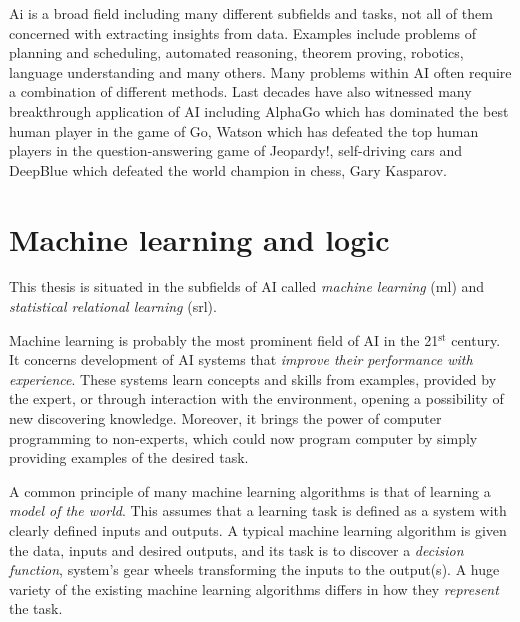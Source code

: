 Ai is a broad field including many different subfields and tasks, not all of them concerned with extracting insights from data.
Examples include problems of planning and scheduling, automated reasoning, theorem proving, robotics, language understanding and many others.
Many problems within AI often require a combination of different methods.
Last decades have also witnessed many breakthrough application of AI including AlphaGo \cite{SilverHuangEtAl16nature,silver2017mastering} which has dominated the best human player in the game of Go, Watson \cite{journals/aim/FerrucciBCFGKLMNPSW10} which has defeated the top human players in the question-answering game of Jeopardy!, self-driving cars and DeepBlue \cite{Hsu:2002:BDB:601291}  which defeated the world champion in chess, Gary Kasparov.





\section{Machine learning and logic}

This thesis is situated in the subfields of AI called \textit{machine learning} (\gls{ml}) and \textit{statistical relational learning} (\gls{srl}).


Machine learning is probably the most prominent field of AI in the 21$^{\text{st}}$ century.
It concerns development of AI systems that \textit{improve their performance with experience}.
These systems learn concepts and skills from examples, provided by the expert, or through interaction with the environment, opening a possibility of new discovering knowledge.
Moreover, it brings the power of computer programming to non-experts, which could now program computer by simply providing examples of the desired task.



A common principle of many machine learning algorithms is that of learning a \textit{model of the world}. 
This assumes that a learning task is defined as a system with clearly defined inputs and outputs.
A typical machine learning algorithm is given the data, inputs and desired outputs, and its task is to discover a \textit{decision function}, system's gear wheels transforming the inputs to the output(s).
A huge variety of the existing machine learning algorithms differs in how they \textit{represent} the task.


